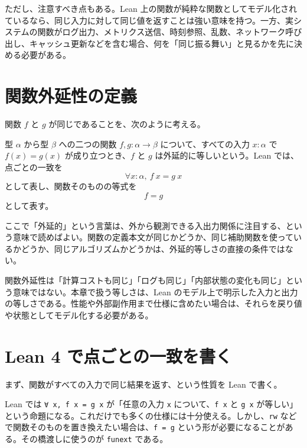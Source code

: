ただし、注意すべき点もある。Lean 上の関数が純粋な関数としてモデル化されているなら、同じ入力に対して同じ値を返すことは強い意味を持つ。一方、実システムの関数がログ出力、メトリクス送信、時刻参照、乱数、ネットワーク呼び出し、キャッシュ更新などを含む場合、何を「同じ振る舞い」と見るかを先に決める必要がある。

\section{関数外延性の定義}

関数 \(f\) と \(g\) が同じであることを、次のように考える。

\begin{definitionbox}
型 \(\alpha\) から型 \(\beta\) への二つの関数 \(f, g : \alpha \to \beta\) について、すべての入力 \(x : \alpha\) で \(f(x) = g(x)\) が成り立つとき、\(f\) と \(g\) は外延的に等しいという。Lean では、点ごとの一致を
\[
  \forall x : \alpha,\ f\ x = g\ x
\]
として表し、関数そのものの等式を
\[
  f = g
\]
として表す。
\end{definitionbox}

ここで「外延的」という言葉は、外から観測できる入出力関係に注目する、という意味で読めばよい。関数の定義本文が同じかどうか、同じ補助関数を使っているかどうか、同じアルゴリズムかどうかは、外延的等しさの直接の条件ではない。

\begin{warningbox}
関数外延性は「計算コストも同じ」「ログも同じ」「内部状態の変化も同じ」という意味ではない。本章で扱う等しさは、Lean のモデル上で明示した入力と出力の等しさである。性能や外部副作用まで仕様に含めたい場合は、それらを戻り値や状態としてモデル化する必要がある。
\end{warningbox}

\section{Lean 4 で点ごとの一致を書く}

まず、関数がすべての入力で同じ結果を返す、という性質を Lean で書く。

\begin{leanbox}
Lean では \texttt{∀ x, f x = g x} が「任意の入力 \texttt{x} について、\texttt{f x} と \texttt{g x} が等しい」という命題になる。これだけでも多くの仕様には十分使える。しかし、\texttt{rw} などで関数そのものを置き換えたい場合は、\texttt{f = g} という形が必要になることがある。その橋渡しに使うのが \texttt{funext} である。
\end{leanbox}

